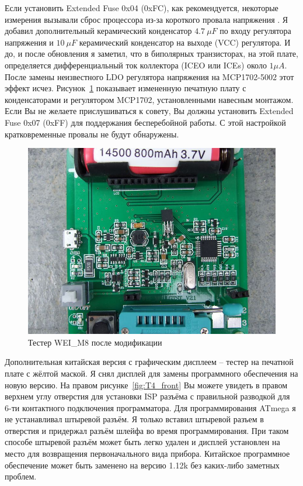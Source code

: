 Если установить Extended Fuse 0x04 (0xFC), как рекомендуется, некоторые измерения вызывали сброс
процессора из-за короткого провала напряжения .
Я добавил дополнительный керамический конденсатор \(4.7~\mu F\) по входу 
регулятора напряжения и \(10~\mu F\) керамический конденсатор на выходе (VCC) регулятора.
И до, и после обновления я заметил, что в биполярных транзисторах, на этой плате, определяется 
дифференциальный ток коллектора (ICEO или ICEs) около \(1\mu A\).
После замены неизвестного LDO регулятора напряжения на MCP1702-5002 этот эффект исчез. 
Рисунок~\ref{fig:WeiM8mod} показывает измененную печатную плату с конденсаторами и регулятором MCP1702, 
установленными навесным монтажом.
Если Вы не желаете прислушиваться к совету, Вы должны установить Extended Fuse 0x07 (0xFF)
для поддержания бесперебойной работы. С этой настройкой кратковременные провалы не будут обнаружены.
\begin{figure}[H]
\centering
\includegraphics[width=.7\textwidth]{../PNG/WEI_M8_modified.JPG}
\caption{Тестер WEI\_M8 после модификации}
\label{fig:WeiM8mod}
\end{figure}
Дополнительная китайская версия с графическим дисплеем -- тестер  
на печатной плате с жёлтой маской.
Я снял дисплей для замены программного обеспечения на новую версию.
На правом рисунке~\ref{fig:T4_front} Вы можете увидеть в правом верхнем углу отверстия для установки 
ISP разъёма с правильной разводкой для 6-ти контактного подключения программатора.
Для программирования ATmega я не устанавливал штыревой разъём. Я только вставил штыревой разъем  
в отверстия и придержал разъём шлейфа во время программирования.
При таком способе штыревой разъём может быть легко удален и дисплей установлен на место для 
возвращения первоначального вида прибора.
Китайское программное обеспечение может быть заменено на версию 1.12k без каких-либо заметных проблем.
